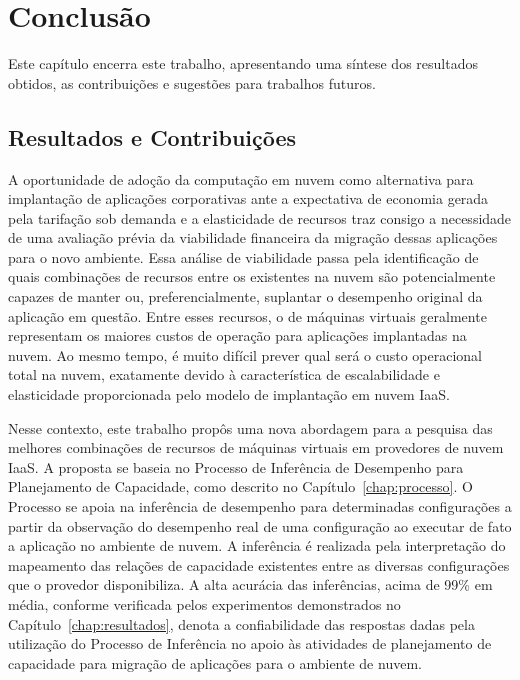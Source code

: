 \chapter{Conclusão}
\label{chap:conclusao}
Este capítulo encerra este trabalho, apresentando uma síntese dos resultados 
obtidos, as contribuições e sugestões para trabalhos futuros.

\section{Resultados e Contribuições}
A oportunidade de adoção da computação em nuvem como alternativa para implantação 
de aplicações corporativas ante a expectativa de economia gerada pela tarifação 
sob demanda e a elasticidade de recursos traz consigo a necessidade de uma
avaliação prévia da viabilidade financeira da migração dessas aplicações para
o novo ambiente. Essa análise de viabilidade passa pela identificação de quais 
combinações de recursos entre os existentes na nuvem são potencialmente capazes 
de manter ou, preferencialmente, suplantar o desempenho original da aplicação em 
questão. Entre esses recursos, o de máquinas virtuais geralmente representam os
maiores custos de operação para aplicações implantadas na nuvem. Ao mesmo tempo,
é muito difícil prever qual será o custo operacional total na nuvem, exatamente
devido à característica de escalabilidade e elasticidade proporcionada pelo modelo
de implantação em nuvem IaaS.

Nesse contexto, este trabalho propôs uma nova abordagem para a pesquisa das 
melhores combinações de recursos de máquinas virtuais em provedores de nuvem IaaS.
A proposta se baseia no Processo de Inferência de Desempenho para Planejamento de
Capacidade, como descrito no Capítulo~\ref{chap:processo}. O Processo se apoia
na inferência de desempenho para determinadas configurações a partir da observação
do desempenho real de uma configuração ao executar de fato a aplicação no
ambiente de nuvem. A inferência é realizada pela interpretação do mapeamento das 
relações de capacidade existentes entre as diversas configurações que o provedor 
disponibiliza. A alta acurácia das inferências, acima de 99\% em média, conforme 
verificada pelos experimentos demonstrados no Capítulo~\ref{chap:resultados}, denota 
a confiabilidade das respostas dadas pela utilização do Processo de Inferência 
no apoio às atividades de planejamento de capacidade para migração de aplicações 
para o ambiente de nuvem. 

